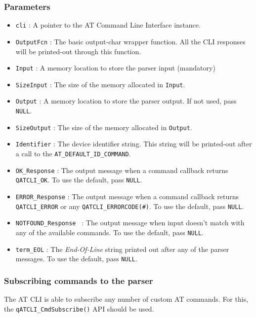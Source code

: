 \subsubsection*{Parameters}
\begin{itemize}
    \item \lstinline{cli} : A pointer to the AT Command Line Interface instance. 
    \item \lstinline{OutputFcn} : The basic output-char wrapper function. All the CLI responses  will be printed-out through this function.
    \item \lstinline{Input} : A memory location to store the parser input (mandatory) 
    \item \lstinline{SizeInput} : The size of the memory allocated in \lstinline{Input}. 
    \item \lstinline{Output} : A memory location to store the parser output. If not used, pass \lstinline{NULL}.
    \item \lstinline{SizeOutput} : The size of the memory allocated in \lstinline{Output}. 
    \item \lstinline{Identifier} : The device identifier string. This string will be printed-out after a call to the \lstinline{AT_DEFAULT_ID_COMMAND}.
    \item \lstinline{OK_Response} : The output message when a command callback returns \lstinline{QATCLI_OK}. To use the default, pass \lstinline{NULL}.
    \item \lstinline{ERROR_Response} : The output message when a command callback returns \lstinline{QATCLI_ERROR} or any \lstinline{QATCLI_ERRORCODE(#)}. To use the default, pass \lstinline{NULL}.
    \item \lstinline{NOTFOUND_Response } : The output message when input doesn't match with any of  the available commands. To use the default, pass \lstinline{NULL}.
    \item \lstinline{term_EOL} : The \textit{End-Of-Line} string printed out after any of the parser messages. To use the default, pass \lstinline{NULL}. 
\end{itemize}

\subsubsection{Subscribing commands to the parser}
The AT CLI is able to subscribe any number of custom AT commands. For this, the 
\lstinline{qATCLI_CmdSubscribe()}  API should be used.

